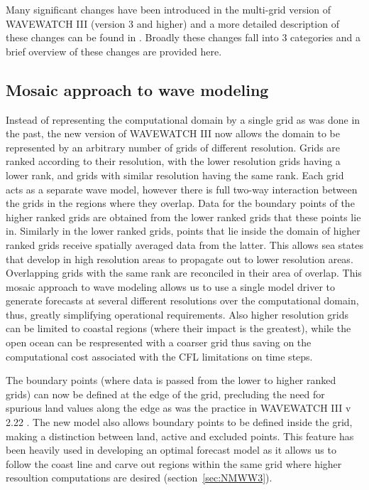 \documentclass[12pt]{article}
\begin{document}
Many significant changes have been introduced in the multi-grid
version of WAVEWATCH III (version 3 and higher) and a more detailed
description of these changes can be found in \cite{tolman-08}. Broadly
these changes fall into 3 categories and a brief overview of these
changes are provided here.
 
\subsection{Mosaic approach to wave modeling}
\label{sec:MGW}

Instead of representing the computational domain by a single grid as
was done in the past, the new version of WAVEWATCH III now allows the
domain to be represented by an arbitrary number of grids of different
resolution. Grids are ranked according to their resolution, with the
lower resolution grids having a lower rank, and grids with similar
resolution having the same rank. Each grid acts as a separate wave
model, however there is full two-way interaction between the grids in
the regions where they overlap. Data for the boundary points of the
higher ranked grids are obtained from the lower ranked grids that
these points lie in. Similarly in the lower ranked grids, points that
lie inside the domain of higher ranked grids receive spatially
averaged data from the latter. This allows sea states that develop in
high resolution areas to propagate out to lower resolution
areas. Overlapping grids with the same rank are reconciled in their
area of overlap. This mosaic approach to wave modeling allows us to
use a single model driver to generate forecasts at several different
resolutions over the computational domain, thus, greatly simplifying
operational requirements. Also higher resolution grids can be limited
to coastal regions (where their impact is the greatest), while the
open ocean can be respresented with a coarser grid thus saving on the
computational cost associated with the CFL limitations on time steps.

The boundary points (where data is passed from the lower to higher
ranked grids) can now be defined at the edge of the grid, precluding
the need for spurious land values along the edge as was the practice
in WAVEWATCH III v 2.22 \cite[]{tolman-02}. The new model also allows
boundary points to be defined inside the grid, making a distinction
between land, active and excluded points. This feature has been
heavily used in developing an optimal forecast model as it allows us
to follow the coast line and carve out regions within the same grid
where higher resoultion computations are desired (section~\ref{sec:NMWW3}).
\end{document}
